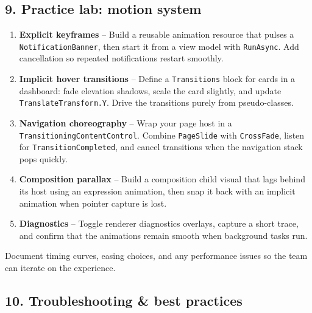 \subsection{9. Practice lab: motion
system}\label{practice-lab-motion-system}

\begin{enumerate}
\def\labelenumi{\arabic{enumi}.}
\tightlist
\item
  \textbf{Explicit keyframes} -- Build a reusable animation resource
  that pulses a \passthrough{\lstinline!NotificationBanner!}, then start
  it from a view model with \passthrough{\lstinline!RunAsync!}. Add
  cancellation so repeated notifications restart smoothly.
\item
  \textbf{Implicit hover transitions} -- Define a
  \passthrough{\lstinline!Transitions!} block for cards in a dashboard:
  fade elevation shadows, scale the card slightly, and update
  \passthrough{\lstinline!TranslateTransform.Y!}. Drive the transitions
  purely from pseudo-classes.
\item
  \textbf{Navigation choreography} -- Wrap your page host in a
  \passthrough{\lstinline!TransitioningContentControl!}. Combine
  \passthrough{\lstinline!PageSlide!} with
  \passthrough{\lstinline!CrossFade!}, listen for
  \passthrough{\lstinline!TransitionCompleted!}, and cancel transitions
  when the navigation stack pops quickly.
\item
  \textbf{Composition parallax} -- Build a composition child visual that
  lags behind its host using an expression animation, then snap it back
  with an implicit animation when pointer capture is lost.
\item
  \textbf{Diagnostics} -- Toggle renderer diagnostics overlays, capture
  a short trace, and confirm that the animations remain smooth when
  background tasks run.
\end{enumerate}

Document timing curves, easing choices, and any performance issues so
the team can iterate on the experience.

\subsection{10. Troubleshooting \& best
practices}\label{troubleshooting-best-practices-3}

